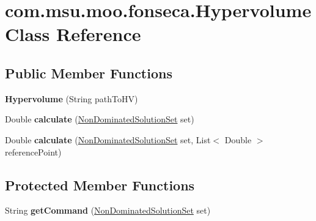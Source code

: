 \hypertarget{classcom_1_1msu_1_1moo_1_1fonseca_1_1Hypervolume}{\section{com.\-msu.\-moo.\-fonseca.\-Hypervolume Class Reference}
\label{classcom_1_1msu_1_1moo_1_1fonseca_1_1Hypervolume}
}
\subsection*{Public Member Functions}
\begin{DoxyCompactItemize}
\item 
\hypertarget{classcom_1_1msu_1_1moo_1_1fonseca_1_1Hypervolume_af3065d83378f830c67e6353aa639bed2}{{\bfseries Hypervolume} (String path\-To\-H\-V)}\label{classcom_1_1msu_1_1moo_1_1fonseca_1_1Hypervolume_af3065d83378f830c67e6353aa639bed2}

\item 
\hypertarget{classcom_1_1msu_1_1moo_1_1fonseca_1_1Hypervolume_ae96f9b9409bc84cef00ef85ce7620c90}{Double {\bfseries calculate} (\hyperlink{classcom_1_1msu_1_1moo_1_1model_1_1solution_1_1NonDominatedSolutionSet}{Non\-Dominated\-Solution\-Set} set)}\label{classcom_1_1msu_1_1moo_1_1fonseca_1_1Hypervolume_ae96f9b9409bc84cef00ef85ce7620c90}

\item 
\hypertarget{classcom_1_1msu_1_1moo_1_1fonseca_1_1Hypervolume_aa983676f2bb3b019c55f1f640b0755e7}{Double {\bfseries calculate} (\hyperlink{classcom_1_1msu_1_1moo_1_1model_1_1solution_1_1NonDominatedSolutionSet}{Non\-Dominated\-Solution\-Set} set, List$<$ Double $>$ reference\-Point)}\label{classcom_1_1msu_1_1moo_1_1fonseca_1_1Hypervolume_aa983676f2bb3b019c55f1f640b0755e7}

\end{DoxyCompactItemize}
\subsection*{Protected Member Functions}
\begin{DoxyCompactItemize}
\item 
\hypertarget{classcom_1_1msu_1_1moo_1_1fonseca_1_1Hypervolume_af5fd4d955941d911bad0884bab5ccaaf}{String {\bfseries get\-Command} (\hyperlink{classcom_1_1msu_1_1moo_1_1model_1_1solution_1_1NonDominatedSolutionSet}{Non\-Dominated\-Solution\-Set} set)}\label{classcom_1_1msu_1_1moo_1_1fonseca_1_1Hypervolume_af5fd4d955941d911bad0884bab5ccaaf}

\end{DoxyCompactItemize}
